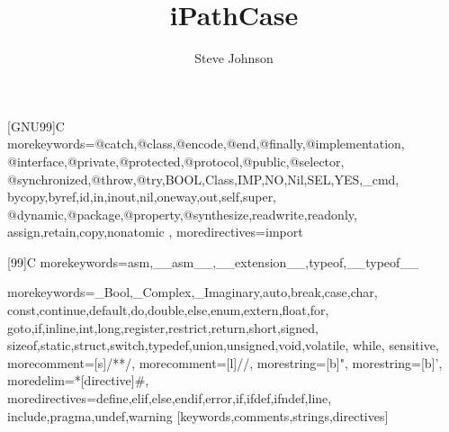 \documentclass[12pt]{report}
\title{iPathCase}
\author{Steve Johnson}
\begin{document}


\newcommand{\mawapp}{ iPathCase-SMDA }
\newcommand{\mawappp}{ iPathCase-SMDA's }
\newcommand{\keggapp}{ iPathCase-KEGG }
\newcommand{\keggappp}{ iPathCase-KEGG's }
\newcommand{\ozsoyoglu}{ \"{O}zsoyo\u{g}lu }


[GNU99]{C}
  {morekeywords={@catch,@class,@encode,@end,@finally,@implementation,%
      @interface,@private,@protected,@protocol,@public,@selector,%
      @synchronized,@throw,@try,BOOL,Class,IMP,NO,Nil,SEL,YES,_cmd,%
      bycopy,byref,id,in,inout,nil,oneway,out,self,super,%
      @dynamic,@package,@property,@synthesize,readwrite,readonly,%
      assign,retain,copy,nonatomic%
      },%
   moredirectives={import}%
}%

[99]{C}
  {morekeywords={asm,__asm__,__extension__,typeof,__typeof__}%
}%

%
  {morekeywords={_Bool,_Complex,_Imaginary,auto,break,case,char,%
      const,continue,default,do,double,else,enum,extern,float,for,%
      goto,if,inline,int,long,register,restrict,return,short,signed,%
      sizeof,static,struct,switch,typedef,union,unsigned,void,volatile,%
      while},%
   sensitive,%
   morecomment=[s]{/*}{*/},%
   morecomment=[l]//,%
   morestring=[b]",%
   morestring=[b]',%
   moredelim=*[directive]\#,%
   moredirectives={define,elif,else,endif,error,if,ifdef,ifndef,line,%
      include,pragma,undef,warning}%
}[keywords,comments,strings,directives]%


\lstset{language=[Objective]C, breakindent=40pt, breaklines}


{\singlespacing\lstset{language=[Objective]C}}
{}
\end{document}
